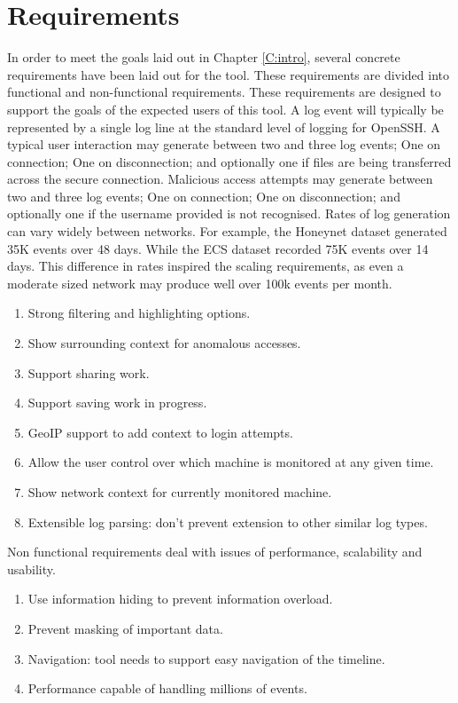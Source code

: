 \section{Requirements}\label{reqs}

In order to meet the goals laid out in Chapter \ref{C:intro}, several concrete requirements have been laid out for the tool. These requirements are divided into functional and non-functional requirements. These requirements are designed to support the goals of the expected users of this tool. A log event will typically be represented by a single log line at the standard level of logging for OpenSSH. A typical user interaction may generate between two and three log events; One on connection; One on disconnection; and optionally one if files are being transferred across the secure connection.
Malicious access attempts may generate  between two and three log events; One on connection; One on disconnection; and optionally one if the username provided is not recognised. Rates of log generation can vary widely between networks. For example, the Honeynet dataset generated 35K events over 48 days. While the ECS dataset recorded 75K events over 14 days. This difference in rates inspired the scaling requirements, as even a moderate sized network may produce well over 100k events per month. 

\begin{enumerate}
\item{Strong filtering and highlighting options.}
\item{Show surrounding context for anomalous accesses.}
\item{Support sharing work.}
\item{Support saving work in progress.}
\item{GeoIP support to add context to login attempts.}
\item{Allow the user control over which machine is monitored at any given time.}
\item{Show network context for currently monitored machine.}
\item{Extensible log parsing: don't prevent extension to other similar log types.}
\end{enumerate}

Non functional requirements deal with issues of performance, scalability and usability.
\begin{enumerate}
\item{Use information hiding to prevent information overload.}
\item{Prevent masking of important data.}
\item{Navigation: tool needs to support easy navigation of the timeline.}
\item{Performance capable of handling millions of events.}
\end{enumerate}

